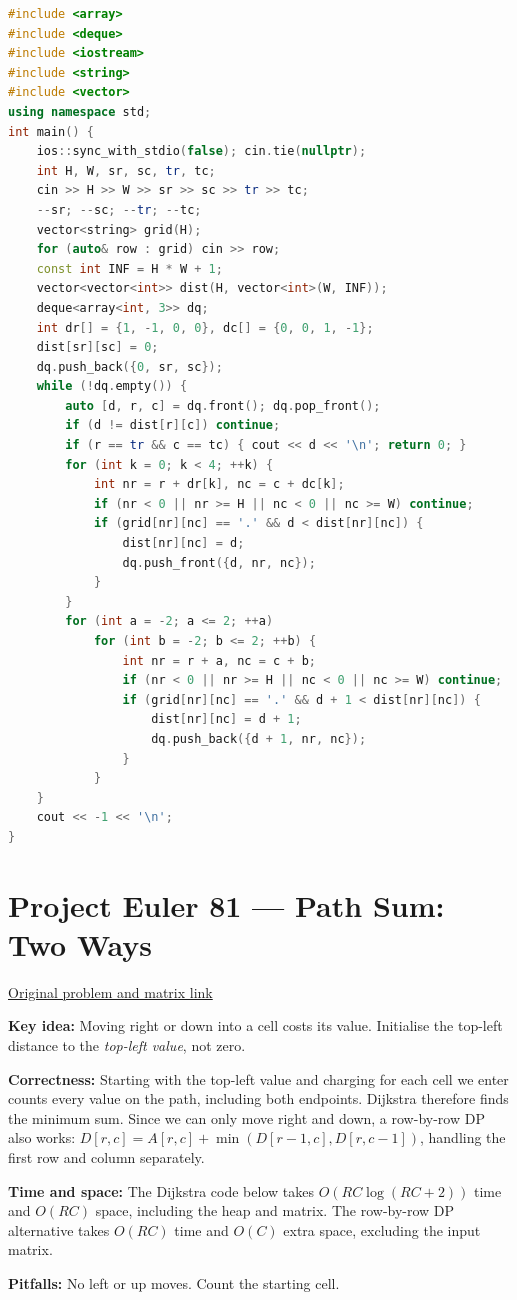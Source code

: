\documentclass[11pt]{article}
\newcommand{\insight}[1]{\par\medskip\noindent\textbf{Key idea:} #1}
\newcommand{\correct}[1]{\par\textbf{Correctness:} #1}
\newcommand{\bounds}[1]{\par\textbf{Time and space:} #1}
\newcommand{\pitfalls}[1]{\par\textbf{Pitfalls:} #1}
\begin{document}
\begin{lstlisting}[language=C++,caption={P08 --- C++17},label={lst:p08-cpp}]
#include <array>
#include <deque>
#include <iostream>
#include <string>
#include <vector>
using namespace std;
int main() {
    ios::sync_with_stdio(false); cin.tie(nullptr);
    int H, W, sr, sc, tr, tc;
    cin >> H >> W >> sr >> sc >> tr >> tc;
    --sr; --sc; --tr; --tc;
    vector<string> grid(H);
    for (auto& row : grid) cin >> row;
    const int INF = H * W + 1;
    vector<vector<int>> dist(H, vector<int>(W, INF));
    deque<array<int, 3>> dq;
    int dr[] = {1, -1, 0, 0}, dc[] = {0, 0, 1, -1};
    dist[sr][sc] = 0;
    dq.push_back({0, sr, sc});
    while (!dq.empty()) {
        auto [d, r, c] = dq.front(); dq.pop_front();
        if (d != dist[r][c]) continue;
        if (r == tr && c == tc) { cout << d << '\n'; return 0; }
        for (int k = 0; k < 4; ++k) {
            int nr = r + dr[k], nc = c + dc[k];
            if (nr < 0 || nr >= H || nc < 0 || nc >= W) continue;
            if (grid[nr][nc] == '.' && d < dist[nr][nc]) {
                dist[nr][nc] = d;
                dq.push_front({d, nr, nc});
            }
        }
        for (int a = -2; a <= 2; ++a)
            for (int b = -2; b <= 2; ++b) {
                int nr = r + a, nc = c + b;
                if (nr < 0 || nr >= H || nc < 0 || nc >= W) continue;
                if (grid[nr][nc] == '.' && d + 1 < dist[nr][nc]) {
                    dist[nr][nc] = d + 1;
                    dq.push_back({d + 1, nr, nc});
                }
            }
    }
    cout << -1 << '\n';
}
\end{lstlisting}

\section{Project Euler 81 --- Path Sum: Two Ways}
\href{https://projecteuler.net/problem=81}{Original problem and matrix link}
\insight{Moving right or down into a cell costs its value. Initialise the top-left distance to the \emph{top-left value}, not zero.}
\correct{Starting with the top-left value and charging for each cell we enter counts every value on the path, including both endpoints. Dijkstra therefore finds the minimum sum. Since we can only move right and down, a row-by-row DP also works: $D[r,c]=A[r,c]+\min(D[r-1,c],D[r,c-1])$, handling the first row and column separately.}
\bounds{The Dijkstra code below takes $O(RC\log(RC+2))$ time and $O(RC)$ space, including the heap and matrix. The row-by-row DP alternative takes $O(RC)$ time and $O(C)$ extra space, excluding the input matrix.}
\pitfalls{No left or up moves. Count the starting cell.}
\end{document}
